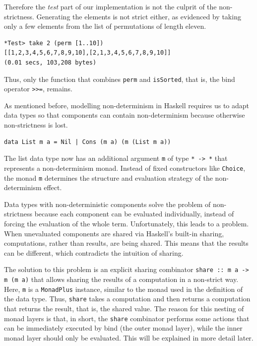 \documentclass[a4paper, 11pt, fleqn, twoside]{scrreprt}
\newcommand{\todo}[1]{\marginpar{\textbf{TODO:} #1}}
\begin{document}
Therefore the \textit{test} part of our implementation is not the culprit of 
the non-strictness. Generating the elements is not strict either, as evidenced 
by taking only a few elements from the list of permutations of length eleven.

\begin{verbatim}
*Test> take 2 (perm [1..10])
[[1,2,3,4,5,6,7,8,9,10],[2,1,3,4,5,6,7,8,9,10]]
(0.01 secs, 103,208 bytes)
\end{verbatim}

Thus, only the function that combines \texttt{perm} and 
\texttt{isSorted}, that is, the bind operator 
\texttt{>>=}, remains.

As mentioned before, modelling non-determinism in Haskell requires us to adapt 
data types so that components can contain non-determinism because otherwise
non-strictness is lost. \todo{Copy examples? New examples? No examples?}

\begin{verbatim}
data List m a = Nil | Cons (m a) (m (List m a))
\end{verbatim}

The list data type now has an additional argument \texttt{m} of 
type \texttt{* -> *} that represents a non-determinism monad. 
Instead of fixed constructors like \texttt{Choice}, the monad 
\texttt{m} determines the structure and evaluation strategy 
of the non-determinism effect.

Data types with non-deterministic components solve the problem of 
non-strictness because each component can be evaluated individually, instead of 
forcing the evaluation of the whole term. Unfortunately, this leads to a 
problem. When unevaluated components are shared via Haskell's built-in sharing, 
computations, rather than results, are being shared. This means that the 
results can be different, which contradicts the intuition of sharing.

The solution to this problem is an explicit sharing combinator 
\texttt{share :: m a -> m (m a)} that allows sharing the results 
of a computation in a non-strict way. Here, \texttt{m} is a 
\texttt{MonadPlus} instance, similar to the monad used in the 
definition of the data type. Thus, \texttt{share} takes a 
computation and then returns a computation that returns the result, that is, 
the shared value. The reason for this nesting of monad layers is that, in 
short, the \texttt{share} combinator performs some actions that 
can be immediately executed by bind (the outer monad layer), while the inner 
monad layer should only be evaluated. This will be explained in more detail 
later.
\end{document}
